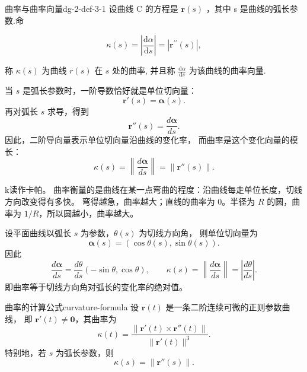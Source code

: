 \begin{definition}{曲率与曲率向量}{dg-2-def-3-1}
设曲线 C 的方程是  \(\boldsymbol{r}(s)\) ，其中 s 是曲线的弧长参数.命\par

\begin{equation*}
\kappa (s) = \left| \frac {\mathrm{d} \alpha}{\mathrm{d} s} \right| = | \boldsymbol {r} ^ {\prime \prime} (s) |,
\end{equation*}

称 \(\kappa(s)\) 为曲线 \(r(s)\) 在 \(s\) 处的曲率, 并且称 \(\frac{\mathrm{d}\alpha}{\mathrm{d}s}\) 为该曲线的曲率向量.
\end{definition}
\begin{note}
    当 $s$ 是弧长参数时，一阶导数恰好就是单位切向量：
\[
\boldsymbol r'(s)=\boldsymbol\alpha(s).
\]
再对弧长 $s$ 求导，得到
\[
\boldsymbol r''(s)=\frac{d\boldsymbol\alpha}{ds}.
\]
因此，二阶导向量表示单位切向量沿曲线的变化率，
而曲率是这个变化向量的模长：
\[
\kappa(s)
=\left\|\frac{d\boldsymbol\alpha}{ds}\right\|
=\|\boldsymbol r''(s)\|.
\]
\end{note}
\begin{dxtips}[曲率是单位切向量对弧长的变化率的大小]
  k读作卡帕。
  曲率衡量的是曲线在某一点弯曲的程度：沿曲线每走单位长度，切线方向改变得有多快。
弯得越急，曲率越大；直线的曲率为 \(0\)。半径为 \(R\) 的圆，曲率为 \(1/R\)，所以圆越小，曲率越大。
\end{dxtips}
\begin{example}
设平面曲线以弧长 $s$ 为参数，$\theta(s)$ 为切线方向角，
则单位切向量为
\[
\boldsymbol\alpha(s)=(\cos\theta(s),\sin\theta(s)).
\]
因此
\[
\frac{d\boldsymbol\alpha}{ds}
=\frac{d\theta}{ds}(-\sin\theta,\cos\theta),
\qquad
\kappa(s)=\left\|\frac{d\boldsymbol\alpha}{ds}\right\|
=\left|\frac{d\theta}{ds}\right|.
\]
即曲率等于切线方向角对弧长的变化率的绝对值。
\end{example}
\begin{definition}{曲率的计算公式}{curvature-formula}
设 $\boldsymbol r(t)$ 是一条二阶连续可微的正则参数曲线，
即 $\boldsymbol r'(t)\neq\boldsymbol 0$，其曲率为
\[
\kappa(t)=
\frac{\lVert\boldsymbol r'(t)\times\boldsymbol r''(t)\rVert}
{\lVert\boldsymbol r'(t)\rVert^3}.
\]
特别地，若 $s$ 为弧长参数，则
\[
\kappa(s)=\lVert\boldsymbol r''(s)\rVert.
\]
\end{definition}
